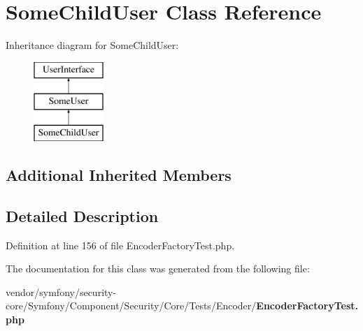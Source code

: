 \section{Some\+Child\+User Class Reference}
\label{class_symfony_1_1_component_1_1_security_1_1_core_1_1_tests_1_1_encoder_1_1_some_child_user}
Inheritance diagram for Some\+Child\+User\+:\begin{figure}[H]
\begin{center}
\leavevmode
\includegraphics[height=3.000000cm]{class_symfony_1_1_component_1_1_security_1_1_core_1_1_tests_1_1_encoder_1_1_some_child_user}
\end{center}
\end{figure}
\subsection*{Additional Inherited Members}


\subsection{Detailed Description}


Definition at line 156 of file Encoder\+Factory\+Test.\+php.



The documentation for this class was generated from the following file\+:\begin{DoxyCompactItemize}
\item 
vendor/symfony/security-\/core/\+Symfony/\+Component/\+Security/\+Core/\+Tests/\+Encoder/{\bf Encoder\+Factory\+Test.\+php}\end{DoxyCompactItemize}
